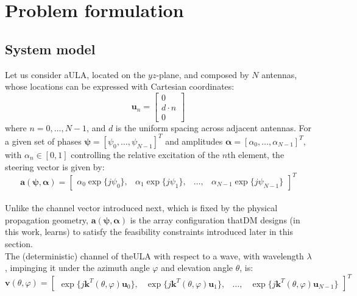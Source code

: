 \section{Problem formulation}

\subsection{System model}
\label{sec:system_model}

Let us consider a\gls{ULA}, located on the $yz$-plane, and composed by $N$ antennas, whose locations can be expressed with Cartesian coordinates:
\begin{equation}
    \mathbf{u}_n = \begin{bmatrix}
    0 \\
    d \cdot n \\
    0
    \end{bmatrix}
    \label{eq:ULA_antenna_location_coordinates}
\end{equation}
where $n = 0, \ldots, N-1$, and $d$ is the uniform spacing across adjacent antennas. For a given set of phases $\boldsymbol{\psi} = [\psi_0, \ldots, \psi_{N-1}]^T$ and amplitudes $\boldsymbol{\alpha} = [\alpha_0, \ldots, \alpha_{N-1}]^T$, with $\alpha_n \in [0,1]$ controlling the relative excitation of the $n$th element, the steering vector is given by:
\begin{equation}
    \mathbf{a}(\boldsymbol{\psi}, \boldsymbol{\alpha}) = \begin{bmatrix}
    \alpha_0\exp\{j\psi_0\}, & \alpha_1\exp\{j\psi_1\}, & \ldots, & \alpha_{N-1}\exp\{j\psi_{N-1}\}
    \end{bmatrix}^T
    \label{eq:ULA_steering_vector}
\end{equation}\\
Unlike the channel vector introduced next, which is fixed by the physical propagation geometry, $\mathbf{a}(\boldsymbol{\psi}, \boldsymbol{\alpha})$ is the array configuration that\gls{DM} designs (in this work, learns) to satisfy the feasibility constraints introduced later in this section.\\
The (deterministic) channel of the\gls{ULA} with respect to a wave, with wavelength $\lambda$,
impinging it under the azimuth angle $\varphi$ and elevation angle $\theta$, is:
\begin{equation}
    \mathbf{v}(\theta, \varphi) = \begin{bmatrix}
    \exp\{j\mathbf{k}^T(\theta, \varphi)\mathbf{u}_0\}, &
    \exp\{j\mathbf{k}^T(\theta, \varphi)\mathbf{u}_1\}, &
    \ldots, &
    \exp\{j\mathbf{k}^T(\theta, \varphi)\mathbf{u}_{N-1}\}
    \end{bmatrix}^T
    \label{eq:ULA_deterministic_channel}
\end{equation}
